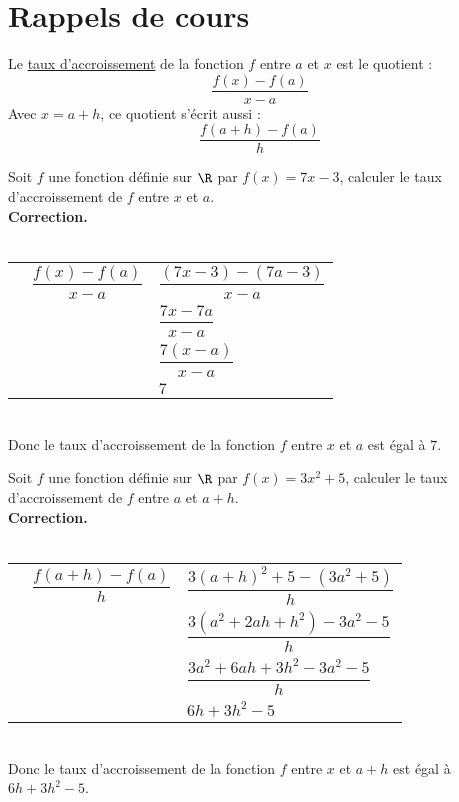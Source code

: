\documentclass[11pt]{article}
\begin{document}
\section{Rappels de cours}

\begin{definition}
Le \underline{taux d'accroissement} de la fonction $f$ entre $a$ et $x$ est le quotient :
$$\dfrac{f(x)-f(a)}{x-a}$$
Avec $x=a+h$, ce quotient s'écrit aussi : $$\dfrac{f(a+h)-f(a)}{h}$$
\end{definition}

\begin{exercice}
   Soit $f$ une fonction définie sur $\R$ par $f(x)=7x-3$, calculer le taux
   d'accroissement de $f$ entre $x$ et $a$. \\
\textbf{Correction.}\\ \\
   \begin{tabular}{p{0.3cm}l!{=}l}
      &  $\dfrac{f(x)-f(a)}{x-a}$ & $\dfrac{(7x-3)-(7a-3)}{x-a}$ \\
      & & $\dfrac{7x-7a}{x-a}$ \\
      & & $\dfrac{7(x-a)}{x-a}$ \\
      & & $7$ \\
   \end{tabular} \\
Donc le taux d'accroissement de la fonction $f$ entre $x$ et $a$ est
égal à $7$.
\end{exercice}

\begin{exercice}
   Soit $f$ une fonction définie sur $\R$ par $f(x)=3x^2+5$, calculer le taux
   d'accroissement de $f$ entre $a$ et $a+h$. \\
\textbf{Correction.}\\ \\
   \begin{tabular}{p{0.3cm}l!{=}l}
      &  $\dfrac{f(a+h)-f(a)}{h}$ & $\dfrac{3(a+h)^2+5-(3a^2+5)}{h}$ \\
      & & $\dfrac{3(a^2+2ah+h^2)-3a^2-5}{h}$ \\
      & & $\dfrac{3a^2+6ah+3h^2-3a^2-5}{h}$ \\
      & & $6h+3h^2-5$ \\
   \end{tabular}\\
Donc le taux d'accroissement de la fonction $f$ entre $x$ et $a+h$ est
égal à $6h+3h^2-5$.
\end{exercice}
\end{document}
